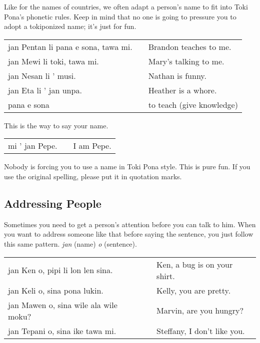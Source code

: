 Like for the names of countries, we often adapt a person's name to fit into Toki Pona's phonetic rules. 
Keep in mind that no one is going to pressure you to adopt a tokiponized name; it's just for fun. 

\begin{supertabular}{p{5,5cm}|ll}
jan Pentan li pana e sona, tawa mi. && Brandon teaches to me. \\
jan Mewi li toki, tawa mi. && Mary's talking to me. \\
jan Nesan li ' musi. && Nathan is funny. \\
jan Eta li ' jan unpa. && Heather is a whore. \\
pana e sona && to teach (give knowledge) \\
\end{supertabular} 

This is the way to say your name. 

\begin{supertabular}{p{5,5cm}|ll}
mi ' jan Pepe. && I am Pepe. \\
\end{supertabular} 

Nobody is forcing you to use a name in Toki Pona style.
This is pure fun.
If you use the original spelling, please put it in quotation marks.
%
\subsection*{Addressing People}
%
Sometimes you need to get a person's attention before you can talk to him. 
When you want to address someone like that before saying the sentence, you just follow this same pattern. 
\textit{jan} (name) \textit{o} (sentence). 

\begin{supertabular}{p{5,5cm}|ll}
jan Ken o, pipi li lon len sina. && Ken, a bug is on your shirt. \\
jan Keli o, sina pona lukin. && Kelly, you are pretty. \\
jan Mawen o, sina wile ala wile moku? && Marvin, are you hungry? \\
jan Tepani o, sina ike tawa mi. && Steffany, I don't like you. \\
\end{supertabular} 

